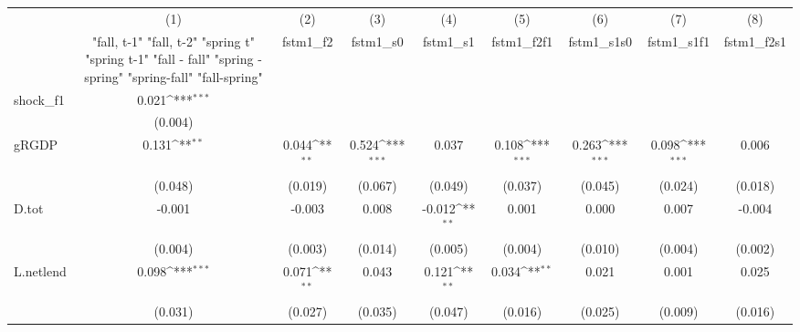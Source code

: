 {
\def\sym#1{\ifmmode^{#1}\else\(^{#1}\)\fi}
\begin{tabular}{l*{8}{c}}
\toprule
            &\multicolumn{1}{c}{(1)}&\multicolumn{1}{c}{(2)}&\multicolumn{1}{c}{(3)}&\multicolumn{1}{c}{(4)}&\multicolumn{1}{c}{(5)}&\multicolumn{1}{c}{(6)}&\multicolumn{1}{c}{(7)}&\multicolumn{1}{c}{(8)}\\
            &\multicolumn{1}{c}{  "fall, t-1" "fall, t-2" "spring t" "spring t-1"  "fall - fall" "spring - spring" "spring-fall" "fall-spring" }&\multicolumn{1}{c}{fstm1\_f2}&\multicolumn{1}{c}{fstm1\_s0}&\multicolumn{1}{c}{fstm1\_s1}&\multicolumn{1}{c}{fstm1\_f2f1}&\multicolumn{1}{c}{fstm1\_s1s0}&\multicolumn{1}{c}{fstm1\_s1f1}&\multicolumn{1}{c}{fstm1\_f2s1}\\
\midrule
shock\_f1    &       0.021\sym{***}&                     &                     &                     &                     &                     &                     &                     \\
            &     (0.004)         &                     &                     &                     &                     &                     &                     &                     \\
\addlinespace
gRGDP       &       0.131\sym{**} &       0.044\sym{**} &       0.524\sym{***}&       0.037         &       0.108\sym{***}&       0.263\sym{***}&       0.098\sym{***}&       0.006         \\
            &     (0.048)         &     (0.019)         &     (0.067)         &     (0.049)         &     (0.037)         &     (0.045)         &     (0.024)         &     (0.018)         \\
\addlinespace
D.tot       &      -0.001         &      -0.003         &       0.008         &      -0.012\sym{**} &       0.001         &       0.000         &       0.007         &      -0.004         \\
            &     (0.004)         &     (0.003)         &     (0.014)         &     (0.005)         &     (0.004)         &     (0.010)         &     (0.004)         &     (0.002)         \\
\addlinespace
L.netlend   &       0.098\sym{***}&       0.071\sym{**} &       0.043         &       0.121\sym{**} &       0.034\sym{**} &       0.021         &       0.001         &       0.025         \\
            &     (0.031)         &     (0.027)         &     (0.035)         &     (0.047)         &     (0.016)         &     (0.025)         &     (0.009)         &     (0.016)         \\

\end{tabular}}
